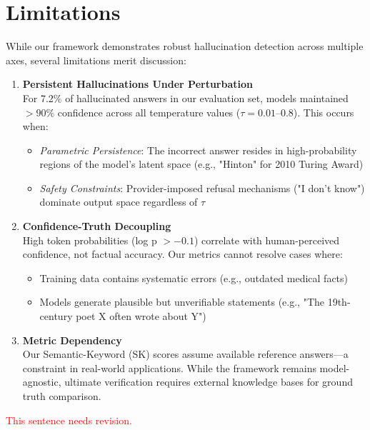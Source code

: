 \documentclass[sigconf]{acmart}
\newcommand{\collab}[1]{\textcolor{red}{#1}}
\begin{document}
\section{Limitations}

While our framework demonstrates robust hallucination detection across multiple axes, several limitations merit discussion:

\begin{enumerate}
    \item \textbf{Persistent Hallucinations Under Perturbation}\\
    For 7.2\% of hallucinated answers in our evaluation set, models maintained $>90\%$ confidence across all temperature values ($\tau = 0.01$--$0.8$). This occurs when:
    \begin{itemize}
        \item \textit{Parametric Persistence}: The incorrect answer resides in high-probability regions of the model's latent space (e.g., "Hinton" for 2010 Turing Award)
        \item \textit{Safety Constraints}: Provider-imposed refusal mechanisms ("I don't know") dominate output space regardless of $\tau$
    \end{itemize}
    
    \item \textbf{Confidence-Truth Decoupling}\\
    High token probabilities (log p $> -0.1$) correlate with human-perceived confidence, not factual accuracy. Our metrics cannot resolve cases where:
    \begin{itemize}
        \item Training data contains systematic errors (e.g., outdated medical facts)
        \item Models generate plausible but unverifiable statements (e.g., "The 19th-century poet X often wrote about Y")
    \end{itemize}
    
    \item \textbf{Metric Dependency}\\
    Our Semantic-Keyword (SK) scores assume available reference answers—a constraint in real-world applications. While the framework remains model-agnostic, ultimate verification requires external knowledge bases for ground truth comparison.
\end{enumerate}

\collab{This sentence needs revision.}



\end{document}
